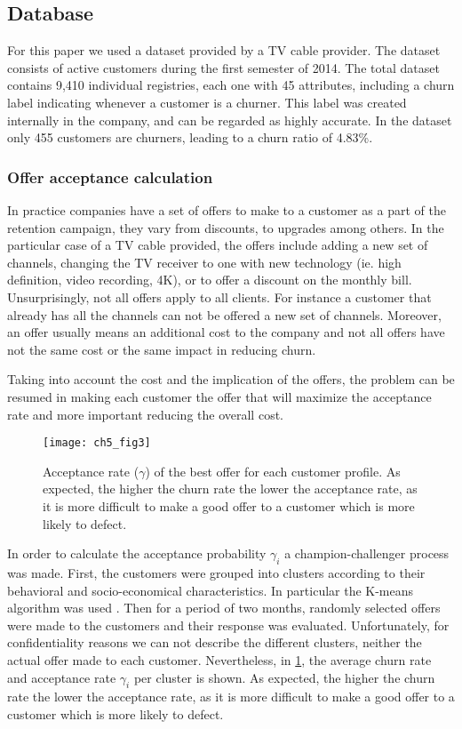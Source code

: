 \subsection{Database}
	
	For this paper we used a dataset provided by a TV cable provider. 
	The dataset consists of active customers during the first semester of 2014. 	
	The total dataset contains 9,410 individual registries, each one with 45 attributes, 
	including a churn label indicating whenever a customer is a churner.
	This label was created internally in the company, and can be regarded as highly accurate. 
	In the dataset only 455 customers are churners, leading to a churn ratio of 4.83\%.
	
	\subsubsection{Offer acceptance calculation}

In practice companies have a set of offers to make to a customer as a part of the retention 
campaign, they vary from discounts, to upgrades among others. In the particular case of a TV cable 
provided, the offers include adding a new set of channels, changing the TV receiver to one with new 
technology (ie. high definition, video recording, 4K),  or to offer a discount on the monthly bill.
Unsurprisingly, not all offers apply to all clients. For instance a customer that already has all 
the channels can not be offered a new set of channels. 
Moreover, an offer usually means an additional cost to the company and not all offers have 
not the same cost or the same impact in reducing churn.

Taking into account the cost and the implication of the offers, the problem can be 
resumed in making each customer the offer that will maximize the acceptance rate and more 
important reducing the overall cost. 

	\begin{figure}[t!]
	  \centering
    \texttt{[image: ch5\_fig3]}
	  \caption{Acceptance rate ($\gamma$) of the best offer for each customer profile. As expected, 
		the higher the churn rate the lower the acceptance rate, as it is more difficult to make a 
		good offer to a customer which is more likely to defect. }
	  \label{fig:ch5:3}
	\end{figure}

In order to calculate the acceptance probability $\gamma_i$ a champion-challenger process was made. 
First, the customers were grouped into clusters according to 
their behavioral and socio-economical characteristics. In particular the K-means algorithm was used 
\citep{Marslan2009}.
Then for a period of two months, randomly selected offers 
were made to the customers and their response was evaluated.
Unfortunately, for confidentiality reasons we can not describe the different clusters, neither the 
actual offer made to each customer. Nevertheless, in \figurename{ \ref{fig:ch5:3}}, the average 
churn rate and acceptance rate $\gamma_i$ per cluster is shown. As expected, the higher the churn 
rate the lower the acceptance rate, as it is more difficult to make a good offer to a customer 
which is more likely to defect.


